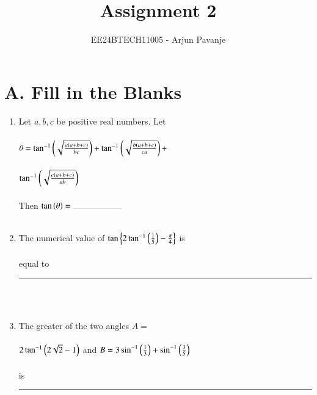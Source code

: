 \documentclass[journal,12pt,twocolumn]{IEEEtran}
\theoremstyle{remark}
\begin{document}

\vspace{3cm}

\title{Assignment 2}
\author{EE24BTECH11005 - Arjun Pavanje}
\maketitle
\newpage
\bigskip

\renewcommand{\thefigure}{\theenumi}
\renewcommand{\thetable}{\theenumi}
\section*{A. Fill in the Blanks}
\begin{enumerate}
\item Let $a,b,c$ be positive real numbers. Let\\\\ 
$\theta = \tan ^{-1}\left(\sqrt{\frac{a\left(a+b+c\right)}{bc}}\right) + \tan ^{-1}\left(\sqrt{\frac{b\left(a+b+c\right)}{ca}}\right) + $ \\\\$ \tan ^{-1}\left(\sqrt{\frac{c\left(a+b+c\right)}{ab}}\right) $\\\\
		Then $\tan \brak{\theta}= \rule{2cm}{0.1pt}$ 
\hfill {}\\\\
\item The numerical value of $\tan \left\{ 2\tan ^{-1}\left(\frac{1}{5}\right)-\frac{\pi}{4} \right\}$ is \\\\ equal to \rule{2cm}{0.1pt}
\hfill {}\\\\
\item The greater of the two angles $A = $ \\\\$ 2 \tan ^{-1}\left(2\sqrt{2}-1\right)$ and $B = 3\sin ^{-1}\left(\frac{1}{3}\right) + \sin ^{-1}\left(\frac{3}{5}\right)$ \\\\ is \rule{2cm}{0.1pt}
\hfill {}\\\\
\end{enumerate}
\end{document}
